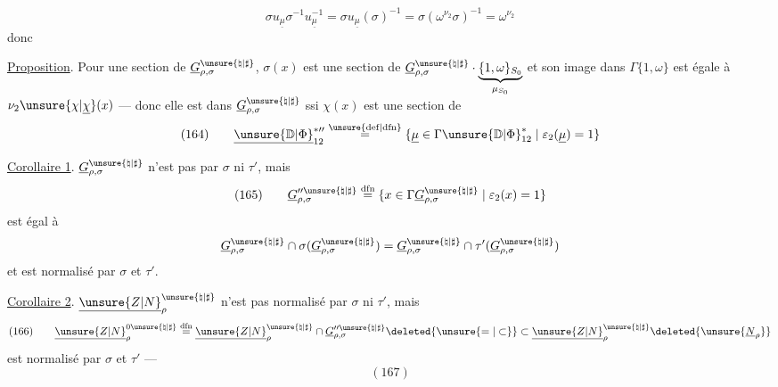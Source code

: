 
\[
\sigma u_{\underline\mu}\sigma^{-1}u_{\underline\mu}^{-1}
=\sigma u_{\underline\mu}(\sigma)^{-1}
=\sigma(\omega^{\nu_2}\sigma)^{-1}=\omega^{\nu_2}
\]
donc

\uline{Proposition}. Pour une section  de $\underline G_{\rho,\sigma}^{\unsure{\natural|\sharp}}$, \deleted{$\unsure{\sigma}$}
$\sigma(x)$ est une section de $\underline G_{\rho,\sigma}^{\unsure{\natural|\sharp}}\cdot\underbrace{\{1,\omega\}_{S_0}}_{\mu_{S_0}}$ et son image dans $\Gamma\{1,\omega\}$ est égale à $\nu_2\unsure{\chi|\underline\chi}(x)$ --- donc elle est dans $\underline G_{\rho,\sigma}^{\unsure{\natural|\sharp}}$ ssi $\chi(x)$ est une section de
\[
(164)\qquad
\underline{\unsure{\mathbb D|\Phi}}_{12}^{*\prime\prime}
\overset{\unsure{\mathrm{def}|\mathrm{dfn}}}{=}
\{\underline\mu\in\Gamma\unsure{\mathbb D|\Phi}_{12}^*\mid\varepsilon_2(\underline\mu)=1\}
\]

\uline{Corollaire 1}. $\underline G_{\rho,\sigma}^{\unsure{\natural|\sharp}}$ n'est pas  par $\sigma$ ni $\tau'$, mais
\[
(165)\qquad
\underline G_{\rho,\sigma}^{\prime\prime\unsure{\natural|\sharp}}
\overset{\mathrm{dfn}}{=}
\{x\in\Gamma\underline G_{\rho,\sigma}^{\unsure{\natural|\sharp}}\mid\varepsilon_2(x)=1\}
\]
est égal à
\[
\underline G_{\rho,\sigma}^{\unsure{\natural|\sharp}}
\cap\sigma(\underline G_{\rho,\sigma}^{\unsure{\natural|\sharp}})
=\underline G_{\rho,\sigma}^{\unsure{\natural|\sharp}}
\cap\tau'(\underline G_{\rho,\sigma}^{\unsure{\natural|\sharp}})
\]
et est normalisé par $\sigma$ et $\tau'$.

\uline{Corollaire 2}. $\underline{\unsure{Z|N}}_\rho^{\unsure{\natural|\sharp}}$ n'est pas normalisé par $\sigma$ ni $\tau'$, mais
\[
(166)\qquad
\underline{\unsure{Z|N}}_\rho^{0\unsure{\natural|\sharp}}
\overset{\mathrm{dfn}}{=}
\underline{\unsure{Z|N}}_\rho^{\unsure{\natural|\sharp}}
\cap\underline G_{\rho,\sigma}^{\prime\prime\unsure{\natural|\sharp}}
\deleted{\unsure{=|\subset}}
\subset\underline{\unsure{Z|N}}_\rho^{\unsure{\natural|\sharp}}
\deleted{\unsure{\underline N_\rho}}
\]
est normalisé par $\sigma$ et $\tau'$ --- 
\[
(167)
\]

